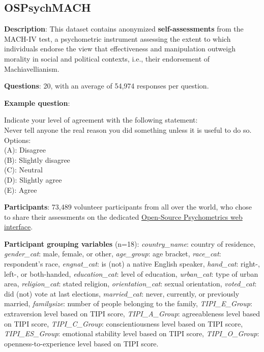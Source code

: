\documentclass{article} %
\begin{document}
\subsection{OSPsychMACH}

\textbf{Description}: This dataset contains anonymized \textbf{self-assessments} from the MACH-IV test, a psychometric instrument assessing the extent to which individuals endorse the view that effectiveness and manipulation outweigh morality in social and political contexts, i.e., their endorsement of Machiavellianism.


\textbf{Questions}: 20, with an average of 54,974 responses per question.

\textbf{Example question}:

\begin{examplebox}
    Indicate your level of agreement with the following statement:\\
    Never tell anyone the real reason you did something unless it is useful to do so.\\
    
    Options:\\
    (A): Disagree\\
    (B): Slightly disagree\\
    (C): Neutral\\
    (D): Slightly agree\\
    (E): Agree
\end{examplebox}

\textbf{Participants}: 73,489 volunteer participants from all over the world, who chose to share their assessments on the dedicated \href{https://openpsychometrics.org/tests/MACH-IV/}{Open-Source Psychometrics web interface}.

\textbf{Participant grouping variables} (n=18):
\textit{country\_name}: country of residence,
\textit{gender\_cat}: male, female, or other,
\textit{age\_group}: age bracket,
\textit{race\_cat}: respondent's race,
\textit{engnat\_cat}: is (not) a native English speaker,
\textit{hand\_cat}: right-, left-, or both-handed,
\textit{education\_cat}: level of education,
\textit{urban\_cat}: type of urban area,
\textit{religion\_cat}: stated religion,
\textit{orientation\_cat}: sexual orientation,
\textit{voted\_cat}: did (not) vote at last elections,
\textit{married\_cat}: never, currently, or previously married,
\textit{familysize}: number of people belonging to the family,
\textit{TIPI\_E\_Group}: extraversion level based on TIPI score,
\textit{TIPI\_A\_Group}: agreeableness level based on TIPI score,
\textit{TIPI\_C\_Group}: conscientiousness level based on TIPI score,
\textit{TIPI\_ES\_Group}: emotional stability level based on TIPI score,
\textit{TIPI\_O\_Group}: openness-to-experience level based on TIPI score.
\end{document}
